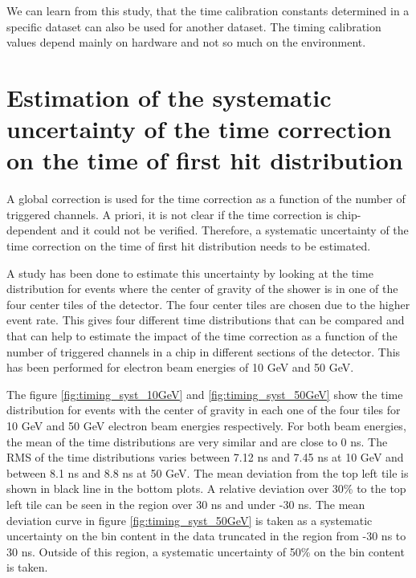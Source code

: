 We can learn from this study, that the time calibration constants determined in a specific dataset can also be used for another dataset. The timing calibration values depend mainly on hardware and not so much on the environment.

\section{Estimation of the systematic uncertainty of the time correction on the time of first hit distribution}
\label{subsec:Systematic_Correction}

A global correction is used for the time correction as a function of the number of triggered channels. A priori, it is not clear if the time correction is chip-dependent and it could not be verified. Therefore, a systematic uncertainty of the time correction on the time of first hit distribution needs to be estimated.

A study has been done to estimate this uncertainty by looking at the time distribution for events where the center of gravity of the shower is in one of the four center tiles of the detector. The four center tiles are chosen due to the higher event rate. This gives four different time distributions that can be compared and that can help to estimate the impact of the time correction as a function of the number of triggered channels in a chip in different sections of the detector. This has been performed for electron beam energies of 10 GeV and 50 GeV.

The figure \ref{fig:timing_syst_10GeV} and \ref{fig:timing_syst_50GeV} show the time distribution for events with the center of gravity in each one of the four tiles for 10 GeV and 50 GeV electron beam energies respectively. For both beam energies, the mean of the time distributions are very similar and are close to 0 ns. The RMS of the time distributions varies between 7.12 ns and 7.45 ns at 10 GeV and between 8.1 ns and 8.8 ns at 50 GeV. The mean deviation from the top left tile is shown in black line in the bottom plots. A relative deviation over 30\% to the top left tile can be seen in the region over 30 ns and under -30 ns. The mean deviation curve in figure \ref{fig:timing_syst_50GeV} is taken as a systematic uncertainty on the bin content in the data truncated in the region from -30 ns to 30 ns. Outside of this region, a systematic uncertainty of 50\% on the bin content is taken.

